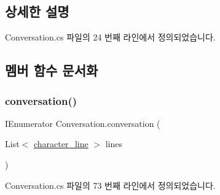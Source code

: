 \subsection{상세한 설명}


Conversation.\+cs 파일의 24 번째 라인에서 정의되었습니다.



\subsection{멤버 함수 문서화}
\mbox{\label{class_conversation_a11eb2e1944c3a857ac1447288d89fc39}} 
\subsubsection{\texorpdfstring{conversation()}{conversation()}}
{\footnotesize\ttfamily I\+Enumerator Conversation.\+conversation (\begin{DoxyParamCaption}\item[{List$<$ \mbox{\hyperlink{classcharacter__line}{character\+\_\+line}} $>$}]{lines }\end{DoxyParamCaption})\hspace{0.3cm}{\ttfamily [private]}}



Conversation.\+cs 파일의 73 번째 라인에서 정의되었습니다.


